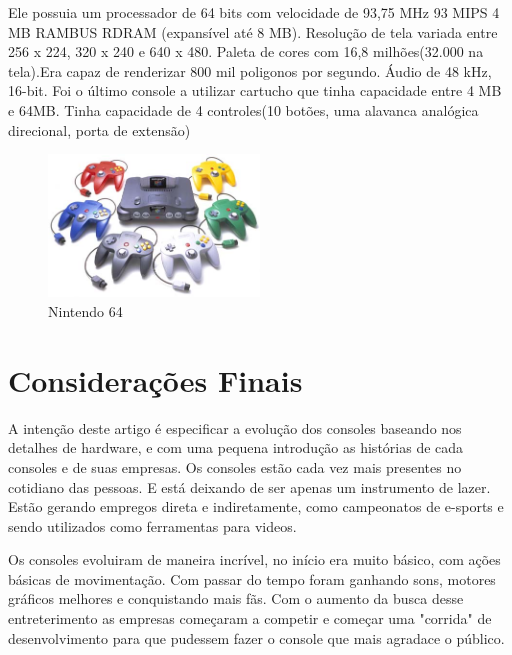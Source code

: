 \documentclass[12pt]{article}
\begin{document}
Ele possuia um processador de 64 bits com velocidade de 93,75 MHz 93 MIPS 4 MB RAMBUS RDRAM (expansível até 8 MB). Resolução de tela variada entre 256 x 224, 320 x 240 e 640 x 480. Paleta de cores com 16,8 milhões(32.000 na tela).Era capaz de renderizar 800 mil poligonos por segundo. Áudio de 48 kHz, 16-bit. Foi o último console a utilizar cartucho que tinha capacidade entre 4 MB e 64MB. Tinha capacidade de 4 controles(10 botões, uma alavanca analógica direcional, porta de extensão)
\begin{figure}[!htb]
    \centering
    \includegraphics[width=0.5\textwidth]{N64.jpeg}
    \caption{Nintendo 64}
    \label{fig:n64}
\end{figure}

\section{Consideraç\~{o}es Finais}
A intenção deste artigo é especificar a evolução dos consoles baseando nos detalhes de hardware, e com uma pequena introdução as histórias de cada consoles e de suas empresas. Os consoles estão cada vez mais presentes no cotidiano das pessoas. E está deixando de ser apenas um instrumento de lazer. Estão gerando empregos direta e indiretamente, como campeonatos de e-sports e sendo utilizados como ferramentas para videos. 

Os consoles evoluiram de maneira incrível, no início era muito básico, com aç\~{o}es básicas de movimentação. Com passar do tempo foram ganhando sons, motores gráficos melhores e conquistando mais fãs. Com o aumento da busca desse entreterimento as empresas começaram a competir e começar uma "corrida" de desenvolvimento para que pudessem fazer o console que mais agradace o público.





\nocite{pc-velho}
\end{document}
